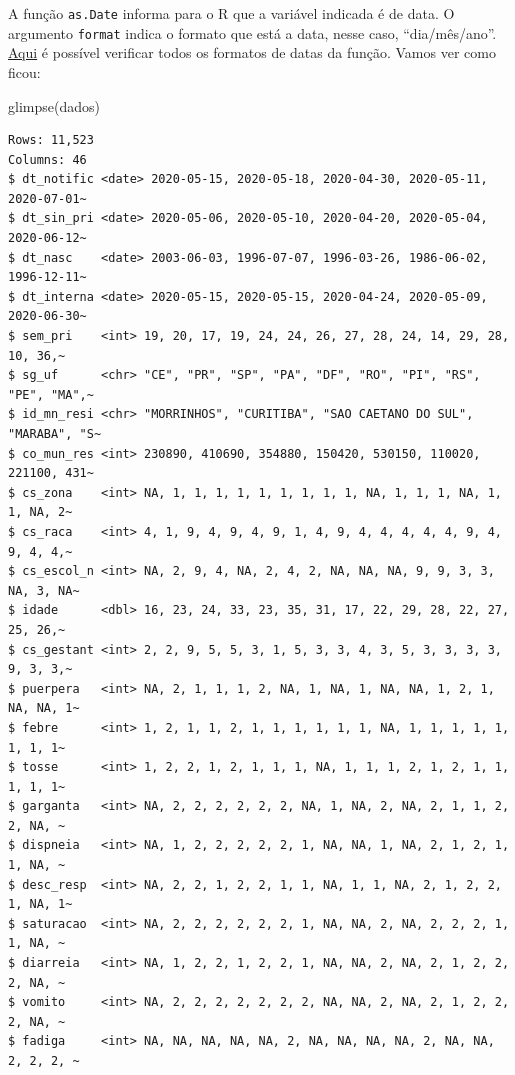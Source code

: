 \documentclass[
  letterpaper,
  DIV=11,
  numbers=noendperiod]{scrreprt}
\newenvironment{Shaded}{\begin{snugshade}}{\end{snugshade}}
\newcommand{\FunctionTok}[1]{\textcolor[rgb]{0.28,0.35,0.67}{#1}}
\newcommand{\NormalTok}[1]{\textcolor[rgb]{0.00,0.23,0.31}{#1}}
\begin{document}
A função \texttt{as.Date} informa para o R que a variável indicada é de
data. O argumento \texttt{format} indica o formato que está a data,
nesse caso, ``dia/mês/ano''.
\href{https://www.statmethods.net/input/dates.html\#:~:text=You\%20can\%20use\%20the\%20as,format\%20gives\%20the\%20appropriate\%20format.}{Aqui}
é possível verificar todos os formatos de datas da função. Vamos ver
como ficou:

\begin{Shaded}
\begin{Highlighting}[]
\FunctionTok{glimpse}\NormalTok{(dados)}
\end{Highlighting}
\end{Shaded}

\begin{verbatim}
Rows: 11,523
Columns: 46
$ dt_notific <date> 2020-05-15, 2020-05-18, 2020-04-30, 2020-05-11, 2020-07-01~
$ dt_sin_pri <date> 2020-05-06, 2020-05-10, 2020-04-20, 2020-05-04, 2020-06-12~
$ dt_nasc    <date> 2003-06-03, 1996-07-07, 1996-03-26, 1986-06-02, 1996-12-11~
$ dt_interna <date> 2020-05-15, 2020-05-15, 2020-04-24, 2020-05-09, 2020-06-30~
$ sem_pri    <int> 19, 20, 17, 19, 24, 24, 26, 27, 28, 24, 14, 29, 28, 10, 36,~
$ sg_uf      <chr> "CE", "PR", "SP", "PA", "DF", "RO", "PI", "RS", "PE", "MA",~
$ id_mn_resi <chr> "MORRINHOS", "CURITIBA", "SAO CAETANO DO SUL", "MARABA", "S~
$ co_mun_res <int> 230890, 410690, 354880, 150420, 530150, 110020, 221100, 431~
$ cs_zona    <int> NA, 1, 1, 1, 1, 1, 1, 1, 1, 1, NA, 1, 1, 1, NA, 1, 1, NA, 2~
$ cs_raca    <int> 4, 1, 9, 4, 9, 4, 9, 1, 4, 9, 4, 4, 4, 4, 4, 9, 4, 9, 4, 4,~
$ cs_escol_n <int> NA, 2, 9, 4, NA, 2, 4, 2, NA, NA, NA, 9, 9, 3, 3, NA, 3, NA~
$ idade      <dbl> 16, 23, 24, 33, 23, 35, 31, 17, 22, 29, 28, 22, 27, 25, 26,~
$ cs_gestant <int> 2, 2, 9, 5, 5, 3, 1, 5, 3, 3, 4, 3, 5, 3, 3, 3, 3, 9, 3, 3,~
$ puerpera   <int> NA, 2, 1, 1, 1, 2, NA, 1, NA, 1, NA, NA, 1, 2, 1, NA, NA, 1~
$ febre      <int> 1, 2, 1, 1, 2, 1, 1, 1, 1, 1, 1, NA, 1, 1, 1, 1, 1, 1, 1, 1~
$ tosse      <int> 1, 2, 2, 1, 2, 1, 1, 1, NA, 1, 1, 1, 2, 1, 2, 1, 1, 1, 1, 1~
$ garganta   <int> NA, 2, 2, 2, 2, 2, 2, NA, 1, NA, 2, NA, 2, 1, 1, 2, 2, NA, ~
$ dispneia   <int> NA, 1, 2, 2, 2, 2, 2, 1, NA, NA, 1, NA, 2, 1, 2, 1, 1, NA, ~
$ desc_resp  <int> NA, 2, 2, 1, 2, 2, 1, 1, NA, 1, 1, NA, 2, 1, 2, 2, 1, NA, 1~
$ saturacao  <int> NA, 2, 2, 2, 2, 2, 2, 1, NA, NA, 2, NA, 2, 2, 2, 1, 1, NA, ~
$ diarreia   <int> NA, 1, 2, 2, 1, 2, 2, 1, NA, NA, 2, NA, 2, 1, 2, 2, 2, NA, ~
$ vomito     <int> NA, 2, 2, 2, 2, 2, 2, 2, NA, NA, 2, NA, 2, 1, 2, 2, 2, NA, ~
$ fadiga     <int> NA, NA, NA, NA, NA, 2, NA, NA, NA, NA, 2, NA, NA, 2, 2, 2, ~

\end{verbatim}
\end{document}
